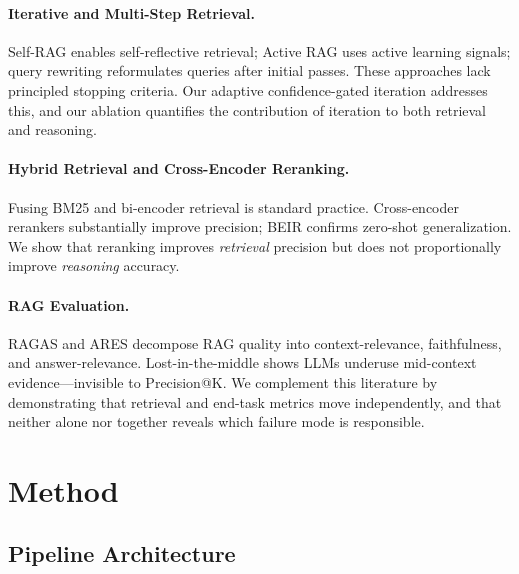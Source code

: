 \documentclass[11pt,a4paper]{article}
\begin{document}
\paragraph{Iterative and Multi-Step Retrieval.}
Self-RAG \citep{asai2024selfrag} enables self-reflective retrieval;
Active RAG \citep{jiang2023activerar} uses active learning signals;
query rewriting \citep{wang2023queryrewrite} reformulates queries
after initial passes.
These approaches lack principled stopping criteria.
Our adaptive confidence-gated iteration addresses this, and our
ablation quantifies the contribution of iteration to both retrieval
and reasoning.

\paragraph{Hybrid Retrieval and Cross-Encoder Reranking.}
Fusing BM25 \citep{robertson2009bm25} and bi-encoder retrieval
\citep{reimers2019sentencebert} is standard practice.
Cross-encoder rerankers \citep{nogueira2019passage} substantially
improve precision; BEIR \citep{thakur2021beir} confirms zero-shot
generalization.
We show that reranking improves \emph{retrieval} precision but does
not proportionally improve \emph{reasoning} accuracy.

\paragraph{RAG Evaluation.}
RAGAS \citep{es2024ragas} and ARES \citep{saad2024ares} decompose
RAG quality into context-relevance, faithfulness, and answer-relevance.
Lost-in-the-middle \citep{liu2024lostmiddle} shows LLMs underuse
mid-context evidence---invisible to Precision@K.
We complement this literature by demonstrating that retrieval and
end-task metrics move independently, and that neither alone nor
together reveals which failure mode is responsible.


\section{Method}
\label{sec:method}

\subsection{Pipeline Architecture}
\end{document}
